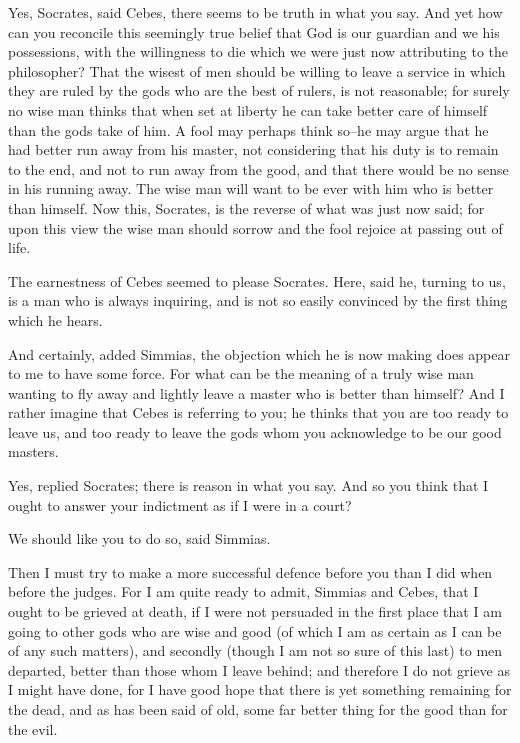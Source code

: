 Yes, Socrates, said Cebes, there seems to be truth in what you say. And
yet how can you reconcile this seemingly true belief that God is our
guardian and we his possessions, with the willingness to die which we
were just now attributing to the philosopher? That the wisest of men
should be willing to leave a service in which they are ruled by the gods
who are the best of rulers, is not reasonable; for surely no wise man
thinks that when set at liberty he can take better care of himself than
the gods take of him. A fool may perhaps think so--he may argue that he
had better run away from his master, not considering that his duty is
to remain to the end, and not to run away from the good, and that there
would be no sense in his running away. The wise man will want to be ever
with him who is better than himself. Now this, Socrates, is the reverse
of what was just now said; for upon this view the wise man should sorrow
and the fool rejoice at passing out of life.

The earnestness of Cebes seemed to please Socrates. Here, said he,
turning to us, is a man who is always inquiring, and is not so easily
convinced by the first thing which he hears.

And certainly, added Simmias, the objection which he is now making does
appear to me to have some force. For what can be the meaning of a truly
wise man wanting to fly away and lightly leave a master who is better
than himself? And I rather imagine that Cebes is referring to you; he
thinks that you are too ready to leave us, and too ready to leave the
gods whom you acknowledge to be our good masters.

Yes, replied Socrates; there is reason in what you say. And so you think
that I ought to answer your indictment as if I were in a court?

We should like you to do so, said Simmias.

Then I must try to make a more successful defence before you than I
did when before the judges. For I am quite ready to admit, Simmias and
Cebes, that I ought to be grieved at death, if I were not persuaded in
the first place that I am going to other gods who are wise and good (of
which I am as certain as I can be of any such matters), and secondly
(though I am not so sure of this last) to men departed, better than
those whom I leave behind; and therefore I do not grieve as I might have
done, for I have good hope that there is yet something remaining for the
dead, and as has been said of old, some far better thing for the good
than for the evil.

